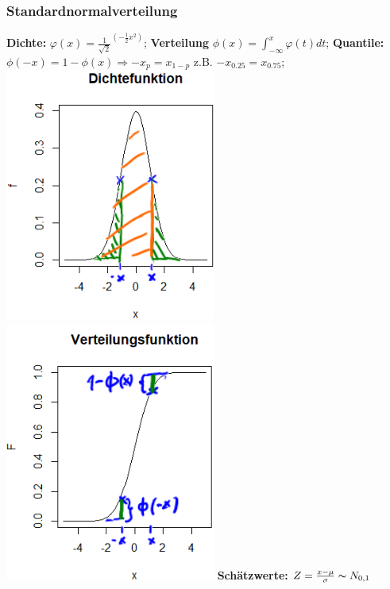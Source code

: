 \subsubsection{Standardnormalverteilung}
\textbf{Dichte:} 
$\varphi(x) = \frac{1}{\sqrt{2}}^{(-\frac{1}{2}x^2)} $; 
\textbf{Verteilung}
$\phi(x) = \int_{-\infty}^{x} \varphi (t) dt$; 
\textbf{Quantile:} 
$ \phi (-x) = 1 - \phi (x) \Rightarrow -x_{p} = x_{1-p} $ z.B. 
$ -x_{0.25} = x_{0.75} $; 
\includegraphics[scale=0.3]{./pic/NormalverteilungDichtefunktion.png}
\includegraphics[scale=0.3]{./pic/NormalverteilungVerteilungsfunktion.png}
\textbf{Schätzwerte:}
$ Z = \frac{x-\mu}{\sigma} \thicksim N_ {0,1}$
